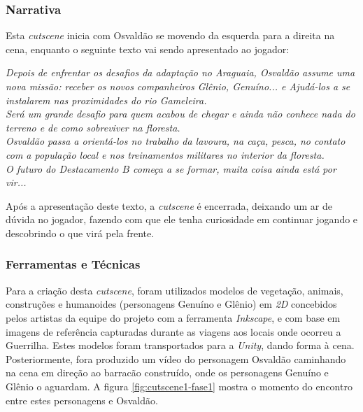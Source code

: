 \subsubsection{Narrativa}

Esta \textit{cutscene} inicia com Osvaldão se movendo da esquerda para a direita na cena, enquanto o seguinte texto vai sendo apresentado ao jogador:

\noindent
\textit{Depois de enfrentar os desafios da adaptação no Araguaia, Osvaldão assume uma nova missão: receber os novos companheiros Glênio, Genuíno... e Ajudá-los a se instalarem nas proximidades do rio Gameleira.\\
Será um grande desafio para quem acabou de chegar e ainda não conhece nada do terreno e de como sobreviver na floresta.\\
Osvaldão passa a orientá-los no trabalho da lavoura, na caça, pesca, no contato com a população local e nos treinamentos militares no interior da floresta.\\
O futuro do Destacamento $B$ começa a se formar, muita coisa ainda está por vir...}

Após a apresentação deste texto, a \textit{cutscene} é encerrada, deixando um ar de dúvida no jogador, fazendo com que ele tenha curiosidade em continuar jogando e descobrindo o que virá pela frente.

\subsubsection{Ferramentas e Técnicas}

Para a criação desta \textit{cutscene}, foram utilizados modelos de vegetação, animais, construções e humanoides (personagens Genuíno e Glênio) em \textit{2D} concebidos pelos artistas da equipe do projeto com a ferramenta \textit{Inkscape}, e com base em imagens de referência capturadas durante as viagens aos locais onde ocorreu a Guerrilha. Estes modelos foram transportados para a \textit{Unity}, dando forma à cena. Posteriormente, fora produzido um vídeo do personagem Osvaldão caminhando na cena em direção ao barracão construído, onde os personagens Genuíno e Glênio o aguardam. A figura \ref{fig:cutscene1-fase1} mostra o momento do encontro entre estes personagens e Osvaldão.

